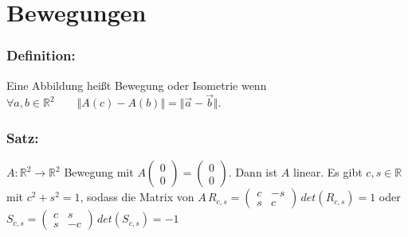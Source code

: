 \section{Bewegungen}
%
%
%
\subsubsection{Definition:}
Eine Abbildung heißt Bewegung oder Isometrie wenn $\forall a,b \in \mathbb{R}^{2}\qquad \Vert A(c) - A(b) \Vert = \Vert \vec{a}-\vec{b}\Vert$.
%
%
%
\subsubsection{Satz:}
$A: \mathbb{R}^{2} \rightarrow \mathbb{R}^{2}$ Bewegung mit $A\begin{pmatrix} 0 \\ 0 \end{pmatrix} = \begin{pmatrix} 0 \\ 0 \end{pmatrix}$. Dann ist $A$ linear. Es gibt $c,s \in \mathbb{R}$ mit $c^{2}+s^{2}=1$, sodass die Matrix von $A \, R_{c,s} = \begin{pmatrix} c & -s \\ s & c \end{pmatrix} \, det(R_{c,s}) = 1$ oder $S_{c,s} = \begin{pmatrix} c & s \\ s & -c \end{pmatrix} \, det(S_{c,s}) = -1$
%
%
%
%
